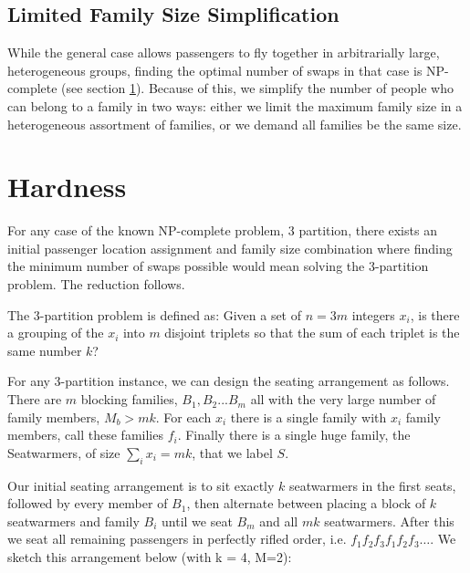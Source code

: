 \subsection{Limited Family Size Simplification}

While the general case allows passengers to fly together in arbitrarially large, heterogeneous groups, finding the optimal number of swaps in that case is NP-complete (see section \ref{sec:hardness}).  Because of this, we simplify the number of people who can belong to a family in two ways: either we limit the maximum family size in a heterogeneous assortment of families, or we demand all families be the same size.  

\section{Hardness} \label{sec:hardness}

For any case of the known NP-complete problem, 3 partition, there exists an initial passenger location assignment and family size combination where finding the minimum number of swaps possible would mean solving the 3-partition problem.  The reduction follows.

The 3-partition problem is defined as: Given a set of $n = 3m$ integers $x_i$, is there a grouping of the $x_i$ into $m$ disjoint triplets so that the sum of each triplet is the same number $k$?

For any 3-partition instance, we can design the seating arrangement as follows.  There are $m$ blocking families, $B_1, B_2... B_m$ all with the very large number of family members, $M_b > mk$.  For each $x_i$ there is a single family with $x_i$ family members, call these families $f_i$.  Finally there is a single huge family, the Seatwarmers, of size $\sum_i x_i = mk$, that we label $S$.

Our initial seating arrangement is to sit exactly $k$ seatwarmers in the first seats, followed by every member of $B_1$, then alternate between placing a block of $k$ seatwarmers and family $B_i$ until we seat $B_m$ and all $mk$ seatwarmers.  After this we seat all remaining passengers in perfectly rifled order, i.e. $f_1 f_2 f_3 f_1 f_2 f_3 \hdots$.  We sketch this arrangement below (with k = 4, M=2):

\begin{figure}[H]
\centering
{}
\end{figure}
\FloatBarrier

